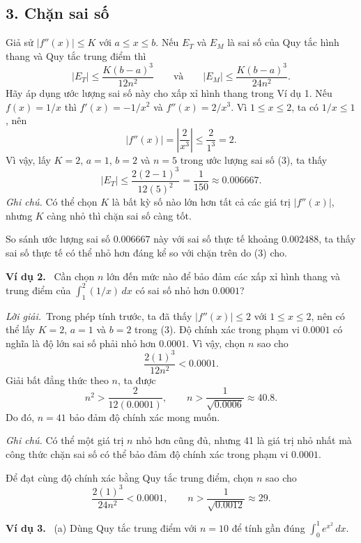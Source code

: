 \documentclass[12pt,a4paper]{article}
\newcommand{\ex}[1]{\par\medskip\noindent\textbf{Ví dụ #1.}\ }
\newcommand{\sol}{\par\nopagebreak[4]\noindent\textit{Lời giải.}\ }
\begin{document}
\subsection*{3. Chặn sai số}
Giả sử $|f''(x)|\le K$ với $a\le x\le b$. Nếu $E_T$ và $E_M$ là sai số của Quy tắc hình thang và Quy tắc trung điểm thì
\begin{equation}
|E_T|\le\frac{K(b-a)^3}{12n^2}\qquad\text{và}\qquad
|E_M|\le\frac{K(b-a)^3}{24n^2}.\tag{3}
\end{equation}
Hãy áp dụng ước lượng sai số này cho xấp xỉ hình thang trong Ví dụ 1. Nếu $f(x)=1/x$ thì $f'(x)=-1/x^2$ và $f''(x)=2/x^3$. Vì $1\le x\le2$, ta có $1/x\le1$, nên
\[|f''(x)|=\left|\frac2{x^3}\right|\le\frac2{1^3}=2.\]
Vì vậy, lấy $K=2$, $a=1$, $b=2$ và $n=5$ trong ước lượng sai số (3), ta thấy
\[|E_T|\le\frac{2(2-1)^3}{12(5)^2}=\frac1{150}\approx0.006667.\]
\textit{Ghi chú.} Có thể chọn $K$ là bất kỳ số nào lớn hơn tất cả các giá trị $|f''(x)|$, nhưng $K$ càng nhỏ thì chặn sai số càng tốt.

So sánh ước lượng sai số $0.006667$ này với sai số thực tế khoảng $0.002488$, ta thấy sai số thực tế có thể nhỏ hơn đáng kể so với chặn trên do (3) cho.

\ex{2} Cần chọn $n$ lớn đến mức nào để bảo đảm các xấp xỉ hình thang và trung điểm của $\int_1^2(1/x)\,dx$ có sai số nhỏ hơn $0.0001$?
\sol Trong phép tính trước, ta đã thấy $|f''(x)|\le2$ với $1\le x\le2$, nên có thể lấy $K=2$, $a=1$ và $b=2$ trong (3). Độ chính xác trong phạm vi $0.0001$ có nghĩa là độ lớn sai số phải nhỏ hơn $0.0001$. Vì vậy, chọn $n$ sao cho
\[\frac{2(1)^3}{12n^2}<0.0001.\]
Giải bất đẳng thức theo $n$, ta được
\[n^2>\frac2{12(0.0001)},\qquad n>\frac1{\sqrt{0.0006}}\approx40.8.\]
Do đó, $n=41$ bảo đảm độ chính xác mong muốn.

\textit{Ghi chú.} Có thể một giá trị $n$ nhỏ hơn cũng đủ, nhưng 41 là giá trị nhỏ nhất mà công thức chặn sai số có thể bảo đảm độ chính xác trong phạm vi $0.0001$.

Để đạt cùng độ chính xác bằng Quy tắc trung điểm, chọn $n$ sao cho
\[\frac{2(1)^3}{24n^2}<0.0001,\qquad n>\frac1{\sqrt{0.0012}}\approx29.\]

\ex{3} (a) Dùng Quy tắc trung điểm với $n=10$ để tính gần đúng $\int_0^1e^{x^2}\,dx$.
\end{document}
